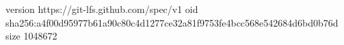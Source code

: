 version https://git-lfs.github.com/spec/v1
oid sha256:a4f00d95977b61a90c80c4d1277ce32a81f9753fe4bcc568e542684d6bd0b76d
size 1048672
